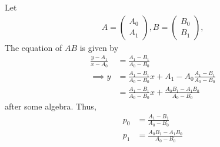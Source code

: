 \documentclass[journal,12pt,twocolumn]{IEEEtran}
\begin{document}
\solution
Let
\begin{align}
A = 
\begin{pmatrix}
A_0
\\
A_1
\end{pmatrix},
B = 
\begin{pmatrix}
B_0
\\
B_1
\end{pmatrix},
\end{align}
%
The equation of $AB$ is given by
%
\begin{align}
\label{eq:line_two_pt}
\frac{y - A_1}{x-A_0} &= \frac{A_1 \! - \! B_1}{A_0 \! - \! B_0} 
\\
\implies  y &= \frac{A_1 \! - \! B_1}{A_0 \! - \! B_0} x + A_1 - A_0 \frac{A_1 \! - \! B_1}{A_0 \! - \! B_0}
\\
&= \frac{A_1 \! - \! B_1}{A_0 \! - \! B_0} x + \frac{A_0 B_1 - A_1B_0}{A_0 \! - \! B_0} 
\label{eq:CA}
\end{align}
%
after some algebra. Thus,
\begin{align}
p_0 &= \frac{A_1 \! - \! B_1}{A_0 \! - \! B_0} 
\\
p_1 &= \frac{A_0 B_1 - A_1B_0}{A_0 \! - \! B_0} 
\end{align}
\end{document}
